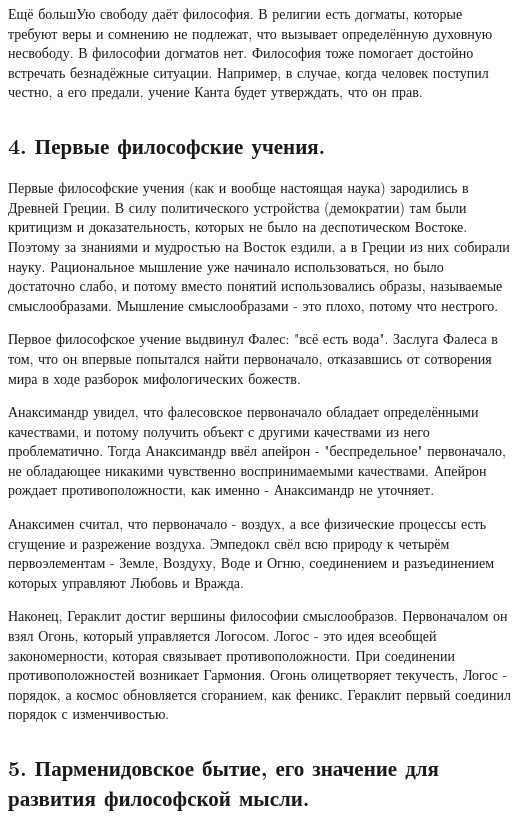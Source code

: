 \documentclass[a4paper, 12pt]{article}
\begin{document}
Ещё большУю свободу даёт философия.
В религии есть догматы, которые требуют веры и сомнению не подлежат, что вызывает определённую духовную несвободу.
В философии догматов нет.
Философия тоже помогает достойно встречать безнадёжные ситуации.
Например, в случае, когда человек поступил честно, а его предали, учение Канта будет утверждать, что он прав.


\subsection*{\textbf{4. Первые философские учения.}}

Первые философские учения (как и вообще настоящая наука) зародились в Древней Греции.
В силу политического устройства (демократии) там были критицизм и доказательность, которых не было на деспотическом Востоке.
Поэтому за знаниями и мудростью на Восток ездили, а в Греции из них собирали науку.
Рациональное мышление уже начинало использоваться, но было достаточно слабо, и потому вместо понятий использовались образы, называемые смыслообразами.
Мышление смыслообразами - это плохо, потому что нестрого.

Первое философское учение выдвинул Фалес: "всё есть вода".
Заслуга Фалеса в том, что он впервые попытался найти первоначало, отказавшись от сотворения мира в ходе разборок мифологических божеств.

Анаксимандр увидел, что фалесовское первоначало обладает определёнными качествами, и потому получить объект с другими качествами из него проблематично.
Тогда Анаксимандр ввёл апейрон - "беспредельное" первоначало, не обладающее никакими чувственно воспринимаемыми качествами.
Апейрон рождает противоположности, как именно - Анаксимандр не уточняет.

Анаксимен считал, что первоначало - воздух, а все физические процессы есть сгущение и разрежение воздуха.
Эмпедокл свёл всю природу к четырём первоэлементам - Земле, Воздуху, Воде и Огню, соединением и разъединением которых управляют Любовь и Вражда.

Наконец, Гераклит достиг вершины философии смыслообразов.
Первоначалом он взял Огонь, который управляется Логосом.
Логос - это идея всеобщей закономерности, которая связывает противоположности.
При соединении противоположностей возникает Гармония.
Огонь олицетворяет текучесть, Логос - порядок, а космос обновляется сгоранием, как феникс.
Гераклит первый соединил порядок с изменчивостью.


\subsection*{\textbf{5. Парменидовское бытие, его значение для развития философской мысли.}}
\end{document}
